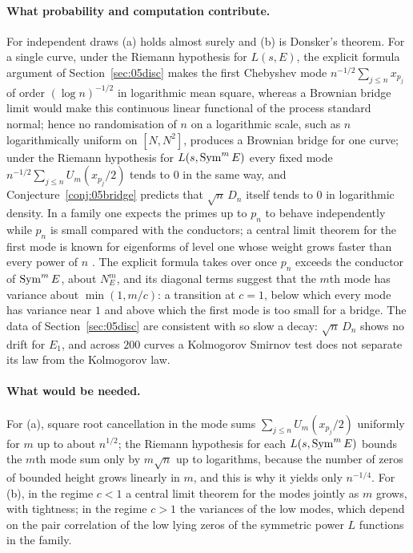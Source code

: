 \paragraph{What probability and computation contribute.} For independent draws (a) holds almost surely and (b) is Donsker's theorem. For a single curve, under the Riemann hypothesis for $L(s,E)$, the explicit formula argument of Section~\ref{sec:05disc} makes the first Chebyshev mode $n^{-1/2}\sum_{j\le n}x_{p_j}$ of order $(\log n)^{-1/2}$ in logarithmic mean square, whereas a Brownian bridge limit would make this continuous linear functional of the process standard normal; hence no randomisation of $n$ on a logarithmic scale, such as $n$ logarithmically uniform on $[N,N^2]$, produces a Brownian bridge for one curve; under the Riemann hypothesis for $L(s,\operatorname{Sym}^mE)$ every fixed mode $n^{-1/2}\sum_{j\le n}U_m(x_{p_j}/2)$ tends to $0$ in the same way, and Conjecture~\ref{conj:05bridge} predicts that $\sqrt n\,D_n$ itself tends to $0$ in logarithmic density. In a family one expects the primes up to $p_n$ to behave independently while $p_n$ is small compared with the conductors; a central limit theorem for the first mode is known for eigenforms of level one whose weight grows faster than every power of $n$ \cite{nagoshi2006}. The explicit formula takes over once $p_n$ exceeds the conductor of $\operatorname{Sym}^mE$, about $N_E^m$, and its diagonal terms suggest that the $m$th mode has variance about $\min(1,m/c)$: a transition at $c=1$, below which every mode has variance near $1$ and above which the first mode is too small for a bridge. The data of Section~\ref{sec:05disc} are consistent with so slow a decay: $\sqrt n\,D_n$ shows no drift for $E_1$, and across $200$ curves a Kolmogorov Smirnov test does not separate its law from the Kolmogorov law.

\paragraph{What would be needed.} For (a), square root cancellation in the mode sums $\sum_{j\le n}U_m(x_{p_j}/2)$ uniformly for $m$ up to about $n^{1/2}$; the Riemann hypothesis for each $L(s,\operatorname{Sym}^mE)$ bounds the $m$th mode sum only by $m\sqrt n$ up to logarithms, because the number of zeros of bounded height grows linearly in $m$, and this is why it yields only $n^{-1/4}$. For (b), in the regime $c<1$ a central limit theorem for the modes jointly as $m$ grows, with tightness; in the regime $c>1$ the variances of the low modes, which depend on the pair correlation of the low lying zeros of the symmetric power $L$ functions in the family.

